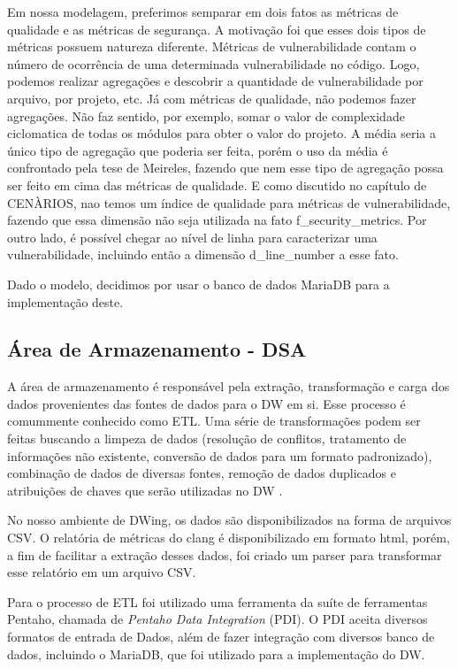 Em nossa modelagem, preferimos semparar em dois fatos as métricas de qualidade e as métricas de segurança. A motivação foi que esses dois tipos de métricas possuem natureza diferente. Métricas de vulnerabilidade contam o número de ocorrência de uma determinada vulnerabilidade no código. Logo, podemos realizar agregações e descobrir a quantidade de vulnerabilidade por arquivo, por projeto, etc. Já com métricas de qualidade, não podemos fazer agregações. Não faz sentido, por exemplo, somar o valor de complexidade ciclomatica de todas os módulos para obter o valor do projeto. A média seria a único tipo de agregação que poderia ser feita, porém o uso da média é confrontado pela tese de Meireles, fazendo que nem esse tipo de agregação possa ser feito em cima das métricas de qualidade. E como discutido no capítulo de CENÀRIOS, nao temos um índice de qualidade para métricas de vulnerabilidade, fazendo que essa dimensão não seja utilizada na fato f\_security\_metrics. Por outro lado, é possível chegar ao nível de linha para caracterizar uma vulnerabilidade, incluindo então a dimensão d\_line\_number a esse fato.

Dado o modelo, decidimos por usar o banco de dados MariaDB para a implementação deste.



\subsection{Área de Armazenamento - DSA}

A área de armazenamento é responsável pela extração, transformação e carga dos dados provenientes das fontes de dados para o DW em si. Esse processo é comummente conhecido como ETL. Uma série de transformações podem ser feitas buscando a limpeza de dados (resolução de conflitos, tratamento de informações não existente, conversão de dados para um formato padronizado), combinação de dados de diversas fontes, remoção de dados duplicados e atribuições de chaves que serão utilizadas no DW \cite{kimball2002}.

%
No nosso ambiente de DWing, os dados são disponibilizados na forma de arquivos CSV. O relatória de métricas do clang é disponibilizado em formato html, porém, a fim de facilitar a extração desses dados, foi criado um parser para transformar esse relatório em um arquivo CSV.


Para o processo de ETL foi utilizado uma ferramenta da suíte de ferramentas Pentaho, chamada de \emph{Pentaho Data Integration} (PDI). O PDI aceita diversos formatos de entrada de Dados, além de fazer integração com diversos banco de dados, incluindo o MariaDB, que foi utilizado para a implementação do DW.


